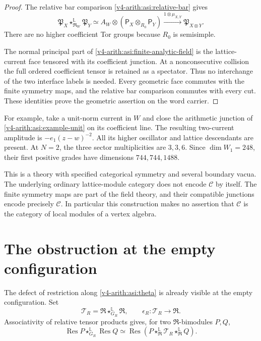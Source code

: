 \begin{proof}
The relative bar comparison \eqref{v4-arith:asi:relative-bar} gives
\[
 \mathfrak P_X\star^{\mathbb L}_{\mathfrak R_W}\mathfrak P_Y
 \simeq A_W\otimes(\mathsf P_X\otimes_{R_0}\mathsf P_Y)
 \xrightarrow{1\otimes\mu_{X,Y}}\mathfrak P_{X\otimes Y}.
\]
There are no higher coefficient Tor groups because $R_0$ is semisimple.


The normal principal part of \eqref{v4-arith:asi:finite-analytic-field}
is the lattice-current face tensored with its coefficient junction.
At a nonconsecutive collision the full ordered coefficient tensor
is retained as a spectator. Thus no interchange of the two interface
labels is needed. Every geometric face commutes with the finite
symmetry maps, and the relative bar comparison commutes with every
cut. These identities prove the geometric assertion on the word carrier.
\end{proof}

For example, take a unit-norm current in $W$ and close the arithmetic
junction of \eqref{v4-arith:asi:example-unit} on its coefficient line.
The resulting two-current amplitude is $-e_1(z-w)^{-2}$.
All its higher oscillator and lattice descendants are present.
At $N=2$, the three sector multiplicities are $3,3,6$. Since
$\dim W_1=248$, their first positive grades have dimensions
$744,744,1488$.

This is a theory with specified categorical symmetry and several
boundary vacua. The underlying ordinary lattice-module category does
not encode $\mathcal C$ by itself. The finite symmetry maps are part
of the field theory, and their compatible junctions encode precisely
$\mathcal C$. In particular this construction makes no assertion that
$\mathcal C$ is the category of local modules of a vertex algebra.

\section{The obstruction at the empty configuration}

The defect of restriction along \eqref{v4-arith:asi:theta} is already visible
at the empty configuration. Set
\[
 \mathcal T_R=\mathfrak R\star^{\mathbb L}_{G_R}\mathfrak R,\qquad
 \epsilon_R:\mathcal T_R\to\mathfrak R.
\]
Associativity of relative tensor products gives, for two
$\mathfrak R$-bimodules $P,Q$,
\[
 \operatorname{Res}P\star^{\mathbb L}_{G_R}\operatorname{Res}Q
 \simeq\operatorname{Res}
 \left(P\star^{\mathbb L}_{\mathfrak R}\mathcal T_R
                \star^{\mathbb L}_{\mathfrak R}Q\right).
\]

